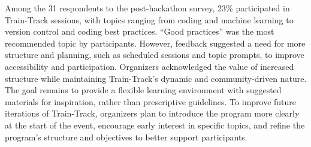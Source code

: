 \documentclass{article}
\begin{document}
Among the 31 respondents to the post-hackathon survey, 23\% participated in Train-Track sessions, with topics ranging from coding and machine learning to version control and coding best practices. “Good practices” was the most recommended topic by participants. However, feedback suggested a need for more structure and planning, such as scheduled sessions and topic prompts, to improve accessibility and participation. Organizers acknowledged the value of increased structure while maintaining Train-Track’s dynamic and community-driven nature. The goal remains to provide a flexible learning environment with suggested materials for inspiration, rather than prescriptive guidelines. To improve future iterations of Train-Track, organizers plan to introduce the program more clearly at the start of the event, encourage early interest in specific topics, and refine the program’s structure and objectives to better support participants.
\end{document}
